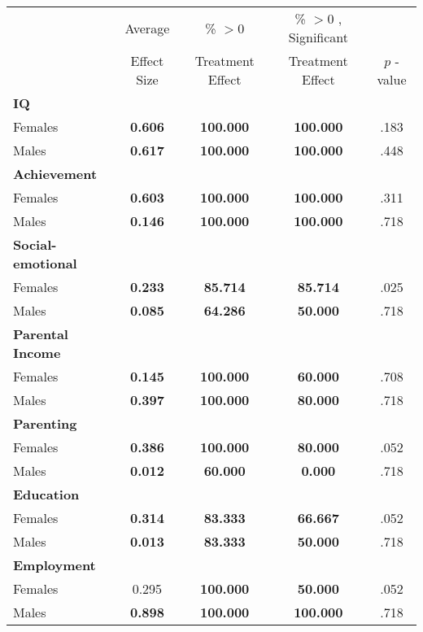 \begin{tabular}{l c c c c}
\toprule
 & Average & \% $ >0 $ & \% $ >0 $ , Significant & \citet{Rosenbaum_2005_Distribution_JRSS} \\
 & Effect Size & Treatment Effect & Treatment Effect & $ p $ -value \\
\midrule
\textbf{IQ} & & & & \\
\quad Females &  \textbf{    0.606} & \textbf{  100.000} & \textbf{  100.000} & .183 \\
\quad Males &  \textbf{    0.617} & \textbf{  100.000} & \textbf{  100.000} & .448 \\
\midrule
\textbf{Achievement} & & & & \\
\quad Females &  \textbf{    0.603} & \textbf{  100.000} & \textbf{  100.000} & .311 \\
\quad Males &  \textbf{    0.146} & \textbf{  100.000} & \textbf{  100.000} & .718 \\
\midrule
\textbf{Social-emotional} & & & & \\
\quad Females &  \textbf{    0.233} & \textbf{   85.714} & \textbf{   85.714} & .025 \\
\quad Males &  \textbf{    0.085} & \textbf{   64.286} & \textbf{   50.000} & .718 \\
\midrule
\textbf{Parental Income} & & & & \\
\quad Females &  \textbf{    0.145} & \textbf{  100.000} & \textbf{   60.000} & .708 \\
\quad Males &  \textbf{    0.397} & \textbf{  100.000} & \textbf{   80.000} & .718 \\
\midrule
\textbf{Parenting} & & & & \\
\quad Females &  \textbf{    0.386} & \textbf{  100.000} & \textbf{   80.000} & .052 \\
\quad Males &  \textbf{    0.012} & \textbf{   60.000} & \textbf{    0.000} & .718 \\
\midrule
\textbf{Education} & & & & \\
\quad Females &  \textbf{    0.314} & \textbf{   83.333} & \textbf{   66.667} & .052 \\
\quad Males &  \textbf{    0.013} & \textbf{   83.333} & \textbf{   50.000} & .718 \\
\midrule
\textbf{Employment} & & & & \\
\quad Females &      0.295 & \textbf{  100.000} & \textbf{   50.000} & .052 \\
\quad Males &  \textbf{    0.898} & \textbf{  100.000} & \textbf{  100.000} & .718 \\

\end{tabular}
